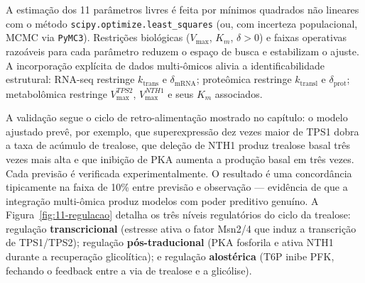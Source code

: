 A estimação dos 11 parâmetros livres é feita por mínimos quadrados não
lineares com o método \texttt{scipy.optimize.least\_squares} (ou, com
incerteza populacional, MCMC via \texttt{PyMC3}). Restrições biológicas
($V_{\max}$, $K_m$, $\delta > 0$) e faixas operativas razoáveis para cada
parâmetro reduzem o espaço de busca e estabilizam o ajuste. A incorporação
explícita de dados multi-ômicos alivia a identificabilidade estrutural:
RNA-seq restringe $k_{\text{trans}}$ e $\delta_{\text{mRNA}}$; proteômica
restringe $k_{\text{transl}}$ e $\delta_{\text{prot}}$; metabolômica
restringe $V_{\max}^{TPS2}$, $V_{\max}^{NTH1}$ e seus $K_m$ associados.

A validação segue o ciclo de retro-alimentação mostrado no capítulo: o
modelo ajustado prevê, por exemplo, que superexpressão dez vezes maior de
TPS1 dobra a taxa de acúmulo de trealose, que deleção de NTH1 produz
trealose basal três vezes mais alta e que inibição de PKA aumenta a
produção basal em três vezes. Cada previsão é verificada
experimentalmente. O resultado é uma concordância tipicamente na faixa de
10\% entre previsão e observação --- evidência de que a integração
multi-ômica produz modelos com poder preditivo genuíno. A
Figura~\ref{fig:11-regulacao} detalha os três níveis regulatórios do
ciclo da trealose: regulação \textbf{transcricional} (estresse ativa o
fator Msn2/4 que induz a transcrição de TPS1/TPS2); regulação
\textbf{pós-traducional} (PKA fosforila e ativa NTH1 durante a
recuperação glicolítica); e regulação \textbf{alostérica} (T6P inibe
PFK, fechando o feedback entre a via de trealose e a glicólise).

